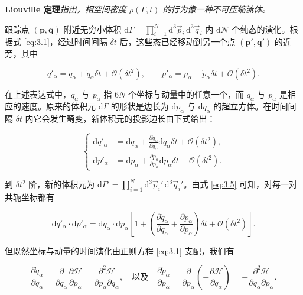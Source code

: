 \textbf{Liouville 定理}\emph{指出，相空间密度 $\rho(\Gamma,t)$ 的行为像一种不可压缩流体。}


跟踪点 $(\bm p,\bm q)$ 附近无穷小体积 $\mathrm{d}\Gamma=\prod_{i=1}^N \mathrm{d}^3\vec p_i\,\mathrm{d}^3\vec q_i$ 内 $\mathrm{d}\mathcal{N}$ 个纯态的演化。根据式 \eqref{eq:3.1}，经过时间间隔 $\delta t$ 后，这些态已经移动到另一个点 $(\bm p',\bm q')$ 的近旁，其中

\begin{equation}\label{eq:3.4}
  q'_\alpha=q_\alpha+\dot q_\alpha\delta t+\mathcal{O}(\delta t^2),\qquad
  p'_\alpha=p_\alpha+\dot p_\alpha\delta t+\mathcal{O}(\delta t^2).
\end{equation}

在上述表达式中，$q_\alpha$ 与 $p_\alpha$ 指 $6N$ 个坐标与动量中的任意一个，而 $\dot q_\alpha$ 与 $\dot p_\alpha$ 是相应的速度。原来的体积元 $\mathrm{d}\Gamma$ 的形状是边长为 $\mathrm{d}p_\alpha$ 与 $\mathrm{d}q_\alpha$ 的超立方体。在时间间隔 $\delta t$ 内它会发生畸变，新体积元的投影边长由下式给出：

\begin{equation}\label{eq:3.5}
  \left\{\begin{aligned}
    \mathrm{d}q'_\alpha &= \mathrm{d}q_\alpha+\frac{\partial\dot q_\alpha}{\partial q_\alpha}\mathrm{d}q_\alpha\delta t+\mathcal{O}(\delta t^2),\\[4pt]
    \mathrm{d}p'_\alpha &= \mathrm{d}p_\alpha+\frac{\partial\dot p_\alpha}{\partial p_\alpha}\mathrm{d}p_\alpha\delta t+\mathcal{O}(\delta t^2).
  \end{aligned}\right.
\end{equation}

到 $\delta t^2$ 阶，新的体积元为 $\mathrm{d}\Gamma'=\prod_{i=1}^N \mathrm{d}^3\vec p_i'\,\mathrm{d}^3\vec q_i'$。由式 \eqref{eq:3.5} 可知，对每一对共轭坐标都有

\begin{equation}\label{eq:3.6}
  \mathrm{d}q'_\alpha\cdot\mathrm{d}p'_\alpha=\mathrm{d}q_\alpha\cdot\mathrm{d}p_\alpha\left[1+\left(\frac{\partial\dot q_\alpha}{\partial q_\alpha}+\frac{\partial\dot p_\alpha}{\partial p_\alpha}\right)\delta t+\mathcal{O}(\delta t^2)\right].
\end{equation}

但既然坐标与动量的时间演化由正则方程 \eqref{eq:3.1} 支配，我们有

\begin{equation}\label{eq:3.7}
  \frac{\partial\dot q_\alpha}{\partial q_\alpha}=\frac{\partial}{\partial q_\alpha}\frac{\partial\mathscr H}{\partial p_\alpha}=\frac{\partial^2\mathscr H}{\partial p_\alpha\partial q_\alpha},
  \quad\text{以及}\quad
  \frac{\partial\dot p_\alpha}{\partial p_\alpha}=\frac{\partial}{\partial p_\alpha}\left(-\frac{\partial\mathscr H}{\partial q_\alpha}\right)=-\frac{\partial^2\mathscr H}{\partial q_\alpha\partial p_\alpha}.
\end{equation}

